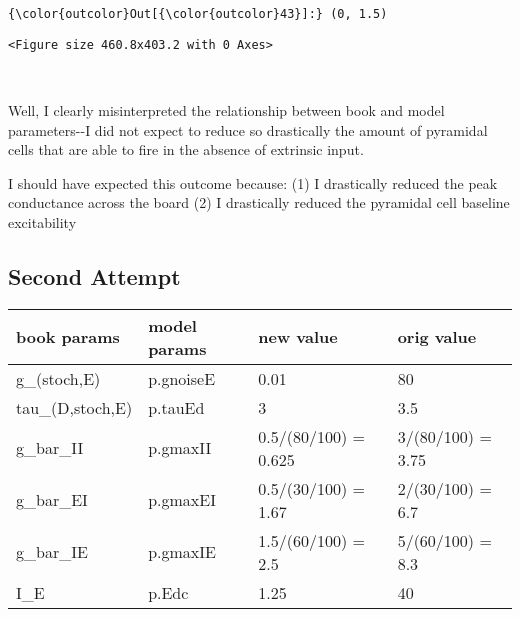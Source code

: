 \documentclass[11pt]{article}
\begin{document}
\begin{Verbatim}[commandchars=\\\{\}]
{\color{outcolor}Out[{\color{outcolor}43}]:} (0, 1.5)
\end{Verbatim}
            
    
    \begin{verbatim}
<Figure size 460.8x403.2 with 0 Axes>
    \end{verbatim}

    
    \begin{center}
    \end{center}
    { \hspace*{\fill} \\}
    
    Well, I clearly misinterpreted the relationship between book and model
parameters-\/-I did not expect to reduce so drastically the amount of
pyramidal cells that are able to fire in the absence of extrinsic input.

I should have expected this outcome because: (1) I drastically reduced
the peak conductance across the board (2) I drastically reduced the
pyramidal cell baseline excitability

    \subsection{Second Attempt}\label{second-attempt}

\begin{longtable}[]{@{}llll@{}}
\toprule
book params & model params & new value & orig value\tabularnewline
\midrule
\endhead
g\_(stoch,E) & p.gnoiseE & 0.01 & 80\tabularnewline
tau\_(D,stoch,E) & p.tauEd & 3 & 3.5\tabularnewline
g\_bar\_II & p.gmaxII & 0.5/(80/100) = 0.625 & 3/(80/100) =
3.75\tabularnewline
g\_bar\_EI & p.gmaxEI & 0.5/(30/100) = 1.67 & 2/(30/100) =
6.7\tabularnewline
g\_bar\_IE & p.gmaxIE & 1.5/(60/100) = 2.5 & 5/(60/100) =
8.3\tabularnewline
I\_E & p.Edc & 1.25 & 40\tabularnewline
\bottomrule
\end{longtable}
\end{document}
